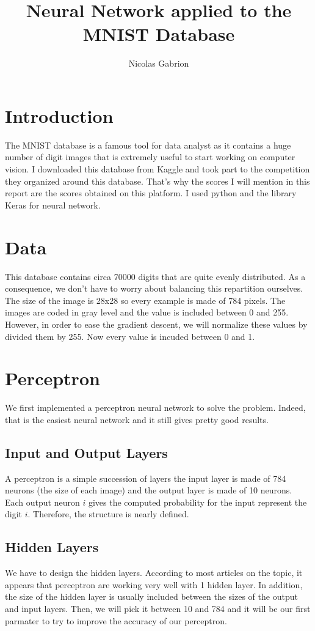 \documentclass[12pt]{article}
\title{Neural Network applied to the MNIST Database}
\author{Nicolas Gabrion}
\date{}
\begin{document}
\maketitle

\section{Introduction}

The MNIST database is a famous tool for data analyst as it contains a huge number of digit images that is extremely useful to start working on computer vision.
I downloaded this database from Kaggle and took part to the competition they organized around this database. That's why the scores I will mention in this report are the scores obtained on this platform.
I used python and the library Keras for neural network.

\section{Data}
This database contains circa 70000 digits that are quite evenly distributed. As a consequence, we don't have to worry about balancing this repartition ourselves.
The size of the image is 28x28 so every example is made of 784 pixels.
The images are coded in gray level and the value is included between 0 and 255. However, in order to ease the gradient descent, we will normalize these values by divided them by 255. Now every value is incuded between 0 and 1.

\section{Perceptron}
We first implemented a perceptron neural network to solve the problem. Indeed, that is the easiest neural network and it still gives pretty good results.

\subsection{Input and Output Layers}
A perceptron is a simple succession of layers the input layer is made of 784 neurons (the size of each image) and the output layer is made of 10 neurons. Each output neuron $i$ gives the computed probability for the input represent the digit $i$.
Therefore, the structure is nearly defined.

\subsection{Hidden Layers}
We have to design the hidden layers. According to most articles on the topic, it appears that perceptron are working very well with 1 hidden layer. In addition, the size of the hidden layer is usually included between the sizes of the output and input layers. Then, we will pick it between 10 and 784 and it will be our first parmater to try to improve the accuracy of our perceptron.
\end{document}
